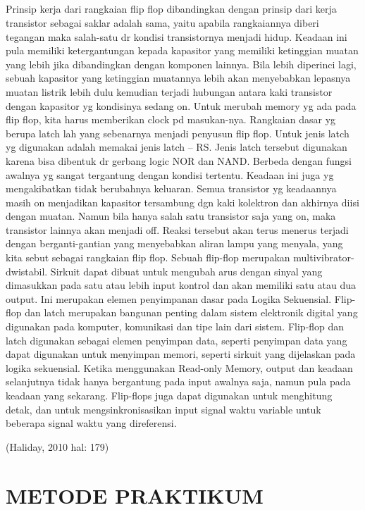 \documentclass[12pt,a4paper]{article}
\begin{document}
\subparagraph{ }
	Prinsip kerja dari rangkaian flip flop dibandingkan dengan prinsip dari kerja transistor sebagai saklar adalah sama, yaitu apabila rangkaiannya diberi tegangan maka salah-satu dr kondisi transistornya menjadi hidup. Keadaan ini pula memiliki ketergantungan kepada kapasitor yang memiliki ketinggian muatan yang lebih jika dibandingkan dengan komponen lainnya. Bila lebih diperinci lagi, sebuah kapasitor yang ketinggian muatannya lebih akan menyebabkan lepasnya muatan listrik lebih dulu kemudian terjadi hubungan antara kaki transistor dengan kapasitor yg kondisinya sedang on.
	Untuk merubah memory yg ada pada flip flop, kita harus memberikan clock pd masukan-nya. Rangkaian dasar yg berupa latch lah yang sebenarnya menjadi penyusun flip flop. Untuk jenis latch yg digunakan adalah memakai jenis latch – RS. Jenis latch tersebut digunakan karena bisa dibentuk dr gerbang logic NOR dan NAND. Berbeda dengan fungsi awalnya yg sangat tergantung dengan kondisi tertentu. Keadaan ini juga yg mengakibatkan tidak berubahnya keluaran.
	Semua transistor yg keadaannya masih on menjadikan kapasitor tersambung dgn kaki kolektron dan akhirnya diisi dengan muatan. Namun bila hanya salah satu transistor saja yang on, maka transistor lainnya akan menjadi off. Reaksi tersebut akan terus menerus terjadi dengan berganti-gantian yang menyebabkan aliran lampu yang menyala, yang kita sebut sebagai rangkaian flip flop.
	Sebuah flip-flop merupakan multivibrator-dwistabil. Sirkuit dapat dibuat untuk mengubah arus dengan sinyal yang dimasukkan pada satu atau lebih input kontrol dan akan memiliki satu atau dua output. Ini merupakan elemen penyimpanan dasar pada Logika Sekuensial. Flip-flop dan latch merupakan bangunan penting dalam sistem elektronik digital yang digunakan pada komputer, komunikasi dan tipe lain dari sistem.
	Flip-flop dan latch digunakan sebagai elemen penyimpan data, seperti penyimpan data yang dapat digunakan untuk menyimpan memori, seperti sirkuit yang dijelaskan pada logika sekuensial. Ketika menggunakan Read-only Memory, output dan keadaan selanjutnya tidak hanya bergantung pada input awalnya saja, namun pula pada keadaan yang sekarang. Flip-flops juga dapat digunakan untuk menghitung detak, dan untuk mengsinkronisasikan input signal waktu variable untuk beberapa signal waktu yang direferensi.

\begin{flushright}
	(Haliday, 2010 hal: 179)
\end{flushright}

\newpage
\section{METODE PRAKTIKUM}
\end{document}

